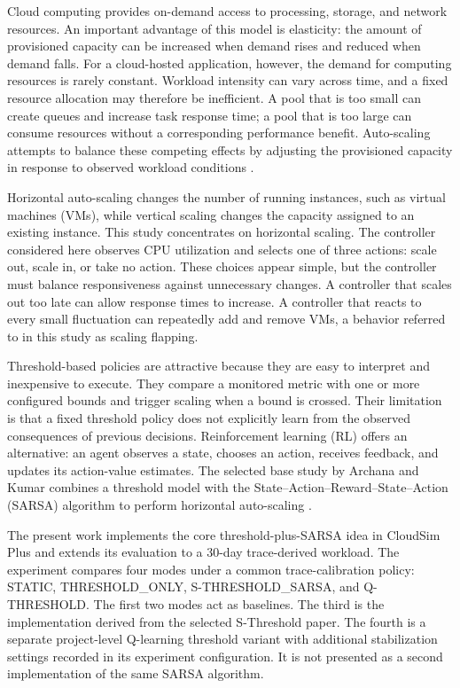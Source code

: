 \documentclass[pdflatex,sn-mathphys-num]{sn-jnl}
\newcommand{\cloudsim}{CloudSim Plus}
\begin{document}
Cloud computing provides on-demand access to processing, storage, and network resources. An important advantage of this model is elasticity: the amount of provisioned capacity can be increased when demand rises and reduced when demand falls. For a cloud-hosted application, however, the demand for computing resources is rarely constant. Workload intensity can vary across time, and a fixed resource allocation may therefore be inefficient. A pool that is too small can create queues and increase task response time; a pool that is too large can consume resources without a corresponding performance benefit. Auto-scaling attempts to balance these competing effects by adjusting the provisioned capacity in response to observed workload conditions \cite{qu2018autoscaling,machiraju2026survey}.

Horizontal auto-scaling changes the number of running instances, such as virtual machines (VMs), while vertical scaling changes the capacity assigned to an existing instance. This study concentrates on horizontal scaling. The controller considered here observes CPU utilization and selects one of three actions: scale out, scale in, or take no action. These choices appear simple, but the controller must balance responsiveness against unnecessary changes. A controller that scales out too late can allow response times to increase. A controller that reacts to every small fluctuation can repeatedly add and remove VMs, a behavior referred to in this study as scaling flapping.

Threshold-based policies are attractive because they are easy to interpret and inexpensive to execute. They compare a monitored metric with one or more configured bounds and trigger scaling when a bound is crossed. Their limitation is that a fixed threshold policy does not explicitly learn from the observed consequences of previous decisions. Reinforcement learning (RL) offers an alternative: an agent observes a state, chooses an action, receives feedback, and updates its action-value estimates. The selected base study by Archana and Kumar combines a threshold model with the State--Action--Reward--State--Action (SARSA) algorithm to perform horizontal auto-scaling \cite{archana2025sthreshold}.

The present work implements the core threshold-plus-SARSA idea in \cloudsim{} and extends its evaluation to a 30-day trace-derived workload. The experiment compares four modes under a common trace-calibration policy: STATIC, THRESHOLD\_ONLY, S-THRESHOLD\_SARSA, and Q-THRESHOLD. The first two modes act as baselines. The third is the implementation derived from the selected S-Threshold paper. The fourth is a separate project-level Q-learning threshold variant with additional stabilization settings recorded in its experiment configuration. It is not presented as a second implementation of the same SARSA algorithm.
\end{document}
